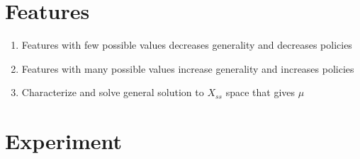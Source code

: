 \documentclass[12pt]{article}
\begin{document}
	\section{Features}
		\begin{enumerate}
			\item Features with few possible values decreases generality and decreases policies
			\item Features with many possible values increase generality and increases policies
			\item Characterize and solve general solution to $X_{ss}$ space that gives $\mu$
		\end{enumerate}
	\section{Experiment}
\end{document}
